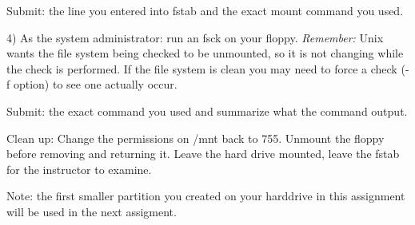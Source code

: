 Submit: the line you entered into {\ltt{}fstab} and
the exact mount command you used.

4) As the system administrator: run an {\ltt{}fsck} on your floppy. 
{\it Remember:} Unix wants the file system being checked to be unmounted,
so it is not changing while the check is performed. If the file system is clean
you may need to force a check ({\ltt{}-f} option) to see one actually occur.

Submit: the exact command you used and summarize what the command output.

Clean up: Change the permissions on {\ltt{}/mnt} back to 755.
Unmount the floppy before removing and returning it.
Leave the hard drive mounted, leave the fstab for the instructor to examine.

Note: the first smaller partition you created on your harddrive
in this assignment will be used in the next assigment.
\bye
